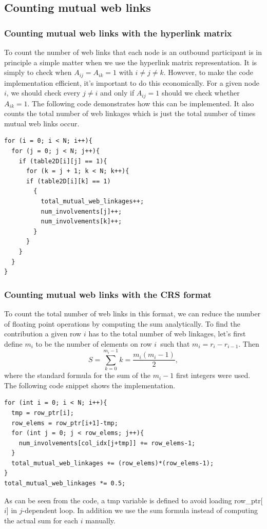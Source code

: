 \documentclass[english,notitlepage, reprint]{revtex4-1}  %
\begin{document}
\subsection*{Counting mutual web links}
\subsubsection{Counting mutual web links with the hyperlink matrix}
To count the number of web links that each node is an outbound participant is in principle a simple matter when we use the hyperlink matrix representation. It is simply to check when $A_{ij} = A_{ik} = 1$ with $i\neq j \neq k$. However, to make the code implementation efficient, it's important to do this economically. For a given node $i$, we should check every $j \neq i$ and only if $A_{ij} = 1$ should we check whether $A_{ik} = 1$. The following code demonstrates how this can be implemented. It also counts the total number of web linkages
which is just the total number of times mutual web links occur.

\begin{lstlisting}[style=customc]
for (i = 0; i < N; i++){
  for (j = 0; j < N; j++){
    if (table2D[i][j] == 1){
      for (k = j + 1; k < N; k++){
      if (table2D[i][k] == 1)
        {
          total_mutual_web_linkages++;
          num_involvements[j]++;
          num_involvements[k]++;
        }
      }
    }
  }
}
\end{lstlisting}

\subsubsection{Counting mutual web links with the CRS format}
To count the total number of web links in this format, we can reduce the number of floating point operations by computing the sum analytically. To find the contribution a given row $i$ has to the total number of web linkages, let's first define $m_i$ to be the number of elements on row $i$ such that $m_i = r_i - r_{i-1}$. Then
\begin{equation}
    S = \sum_{k = 0}^{m_i-1} k = \frac{m_i(m_i-1)}{2},
\end{equation}
where the standard formula for the sum of the $m_i-1$ first integers were used. The following code snippet shows the implementation.
 
\begin{lstlisting}[style=customc]
for (int i = 0; i < N; i++){
  tmp = row_ptr[i];
  row_elems = row_ptr[i+1]-tmp;
  for (int j = 0; j < row_elems; j++){
    num_involvements[col_idx[j+tmp]] += row_elems-1;  
  }
  total_mutual_web_linkages += (row_elems)*(row_elems-1);
}
total_mutual_web_linkages *= 0.5;
\end{lstlisting}
As can be seen from the code, a tmp variable is defined to avoid loading row\_ptr[$i$] in $j$-dependent loop. In addition we use the sum formula instead of computing the actual sum for each $i$ manually.
\end{document}
